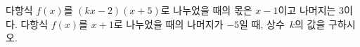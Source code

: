 다항식 $f(x)$를 $(kx-2)(x+5)$로 나누었을 때의 몫은 $x-1$이고 나머지는 $3$이다. 다항식 $f(x)$를 $x+1$로 나누었을 때의 나머지가 $-5$일 때, 상수~$k$의 값을 구하시오.
